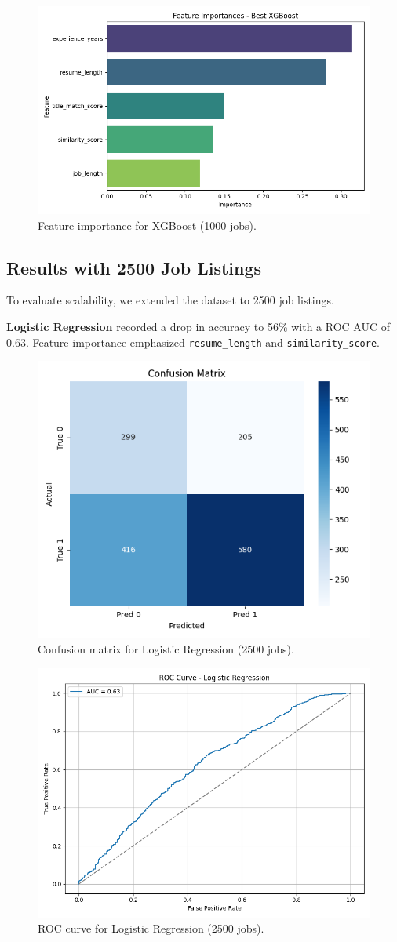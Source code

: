 \documentclass[a4paper]{article}
\begin{document}
\begin{multicols}{2}
\begin{figure}[H]
\centering
\includegraphics[width=0.75\linewidth]{Images/featimp_xgb_1000.png}
\caption{Feature importance for XGBoost (1000 jobs).}
\end{figure}

\subsection{Results with 2500 Job Listings}
To evaluate scalability, we extended the dataset to 2500 job listings.

\textbf{Logistic Regression} recorded a drop in accuracy to 56\% with a ROC AUC of 0.63. Feature importance emphasized \texttt{resume\_length} and \texttt{similarity\_score}.

\begin{figure}[H]
\centering
\includegraphics[width=0.5\linewidth]{Images/conf_matrix_logreg_2500.png}
\caption{Confusion matrix for Logistic Regression (2500 jobs).}
\end{figure}

\begin{figure}[H]
\centering
\includegraphics[width=0.7\linewidth]{Images/roc_logreg_2500.png}
\caption{ROC curve for Logistic Regression (2500 jobs).}
\end{figure}


\end{multicols}
\end{document}
